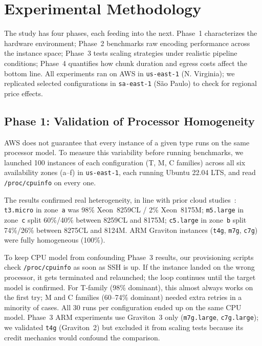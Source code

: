 \documentclass[conference]{IEEEtran}
\begin{document}
\section{Experimental Methodology}
\label{met}

The study has four phases, each feeding into the next. Phase~1 characterizes the hardware environment; Phase~2 benchmarks raw encoding performance across the instance space; Phase~3 tests scaling strategies under realistic pipeline conditions; Phase~4 quantifies how chunk duration and egress costs affect the bottom line. All experiments ran on AWS in \texttt{us-east-1} (N. Virginia); we replicated selected configurations in \texttt{sa-east-1} (São Paulo) to check for regional price effects.

\subsection{Phase 1: Validation of Processor Homogeneity}

AWS does not guarantee that every instance of a given type runs on the same processor model. To measure this variability before running benchmarks, we launched 100 instances of each configuration (T, M, C families) across all six availability zones (a--f) in \texttt{us-east-1}, each running Ubuntu 22.04 LTS, and read \texttt{/proc/cpuinfo} on every one.

The results confirmed real heterogeneity, in line with prior cloud studies~\cite{b2, b5, b6, b7}: \texttt{t3.micro} in zone~\texttt{a} was 98\% Xeon~8259CL / 2\% Xeon~8175M; \texttt{m5.large} in zone~\texttt{c} split 60\%/40\% between 8259CL and 8175M; \texttt{c5.large} in zone~\texttt{b} split 74\%/26\% between 8275CL and 8124M. ARM Graviton instances (\texttt{t4g}, \texttt{m7g}, \texttt{c7g}) were fully homogeneous (100\%).

To keep CPU model from confounding Phase~3 results, our provisioning scripts check \texttt{/proc/cpuinfo} as soon as SSH is up. If the instance landed on the wrong processor, it gets terminated and relaunched; the loop continues until the target model is confirmed. For T-family (98\% dominant), this almost always works on the first try; M and C families (60--74\% dominant) needed extra retries in a minority of cases. All 30 runs per configuration ended up on the same CPU model. Phase~3 ARM experiments use Graviton~3 only (\texttt{m7g.large}, \texttt{c7g.large}); we validated \texttt{t4g} (Graviton~2) but excluded it from scaling tests because its credit mechanics would confound the comparison.
\end{document}
